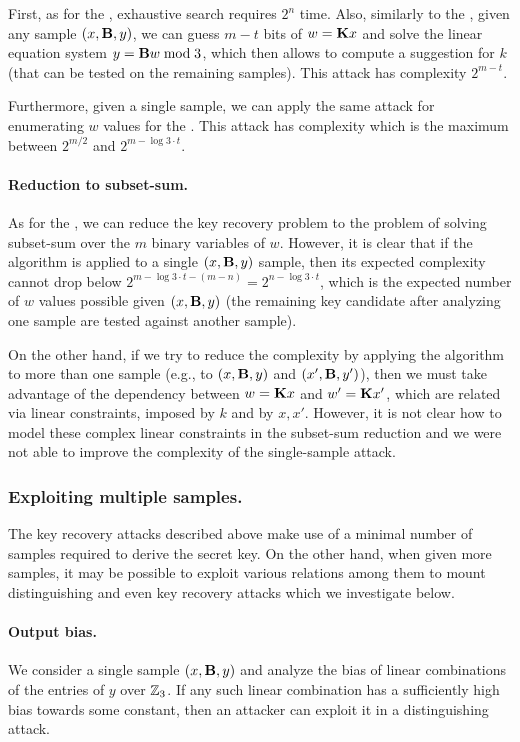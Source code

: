 First, as for the \ttOWF, exhaustive search requires $2^{n}$ time. Also,
similarly to the \ttOWF, given any sample $(x,\mat{B},y)$, we can guess $m - t$ bits of $w = \mat{K} x$ and solve the linear equation system $y = \mat{B} w \bmod 3$, which then allows to compute a suggestion for $k$ (that can be tested on the remaining samples). This attack has complexity $2^{m-t}$.

Furthermore, given a single sample, we can apply the same attack for enumerating $w$ values for the \ttOWF.
This attack has complexity which is the maximum between $2^{m/2}$ and $2^{m - \log 3 \cdot t}$.

\paragraph{Reduction to subset-sum.}
As for the \ttOWF, we can reduce the key recovery problem to the problem of solving subset-sum over the $m$ binary variables of $w$. However, it is clear that if the algorithm is applied to a single $(x,\mat{B},y)$ sample, then its expected complexity cannot drop below $2^{m - \log 3 \cdot t - (m -n)} = 2^{n - \log 3 \cdot t}$, which is the expected number of $w$ values possible given $(x,\mat{B},y)$
(the remaining key candidate after analyzing one sample are tested against another sample).

On the other hand, if we try to reduce the complexity by applying the algorithm to more than one sample (e.g., to $(x,\mat{B},y)$ and $(x',\mat{B},y')$), then we must take advantage of the dependency between $w = \mat{K} x$ and $w' = \mat{K} x'$, which are related via linear constraints, imposed by $k$ and by $x,x'$. However, it is not clear how to model these complex linear constraints in the subset-sum reduction and we were not able to improve the complexity of the single-sample attack.

\subsubsection{Exploiting multiple samples.}
The key recovery attacks described above make use of a minimal number of samples required to derive the secret key. On the other hand, when given more samples, it may be possible to exploit various relations among them to mount distinguishing and even key recovery attacks which we investigate below.

\paragraph{Output bias.}
We consider a single sample $(x,\mat{B},y)$ and analyze the bias of linear combinations of the entries of $y$ over $\mathbb{Z}_3$.
If any such linear combination has a sufficiently high bias towards some constant,
then an attacker can exploit it in a distinguishing attack.

